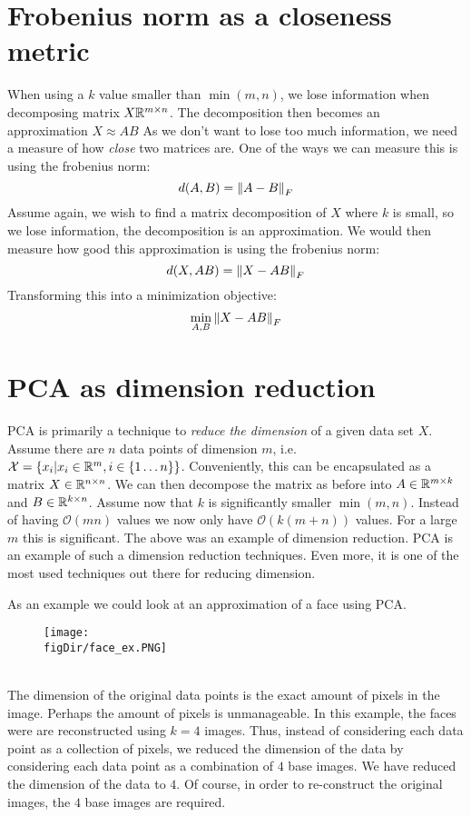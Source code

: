 \section{Frobenius norm as a closeness metric}
When using a $k$ value smaller than $\min(m, n)$, we lose 
information when decomposing matrix $X \mathbb{R}^{m\times n}$.
The decomposition then becomes an approximation $X \approx AB$
As we don't want to lose too much information, we need a 
measure of how \textit{close} two matrices are. 
One of the ways we can measure this is using the frobenius norm:
\begin{equation}
	d(A, B) = \left\lVert A - B\right\rVert_F
\end{equation}
Assume again, we wish to find a matrix decomposition of $X$ where 
$k$ is small, so we lose information, the decomposition is
an approximation. We would then measure how good this approximation
is using the frobenius norm:
\begin{equation}
	d(X,AB) = \left\lVert X - AB\right\rVert_F
\end{equation}
Transforming this into a minimization objective:
\begin{equation}
	\underset{A,B}{\min}\left\lVert X - AB\right\rVert_F
\end{equation}
	
\section{PCA as dimension reduction}
PCA is primarily a technique to \textit{reduce the dimension} of 
a given data set $X$. Assume there are $n$ data points
of dimension $m$, i.e.
$\mathcal{X} = \{x_i| x_i \in \mathbb{R}^m, i \in \{1\dots n\}\}$.
Conveniently, this can be encapsulated as a matrix 
$X \in \mathbb{R}^{n \times n}$. We can then decompose the 
matrix as before into $A \in \mathbb{R}^{m \times k}$ and 
$B \in \mathbb{R}^{k \times n}$. Assume now that $k$ is 
significantly smaller $\min(m,n)$. Instead of having 
$\mathcal{O}(mn)$ values we now only have $\mathcal{O}(k(m+n))$
values. For a large $m$ this is significant. The above
was an example of dimension reduction. PCA is an example of 
such a dimension reduction techniques. Even more, it is 
one of the most used techniques out there for reducing dimension.

\begin{exmp}
As an example we could look at an approximation of a face using PCA.
\begin{figure}[h!]
	\centering
	\texttt{[image: \\figDir/face\_ex.PNG]}
\end{figure}\\
The dimension of the original data points is the 
exact amount of pixels in the image. Perhaps the amount
of pixels is unmanageable. In this example, the faces were
are reconstructed using $k=4$ images. Thus, instead of 
considering each data point as a collection of pixels,
we reduced the dimension of the data by considering each data 
point as a combination of $4$ base images. We have reduced 
the dimension of the data to $4$. Of course, in order 
to re-construct the original images, the $4$ base images 
are required.
\end{exmp}

